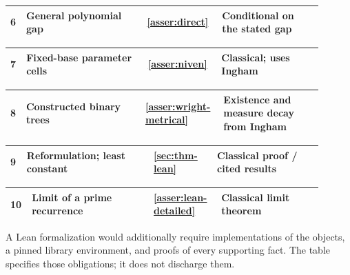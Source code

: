 \documentclass[11pt,reqno]{amsart}
\theoremstyle{blueplain}
\newcounter{asser}
\numberwithin{equation}{section}
\begin{document}
\begin{center}
\begin{tabular}{|@{}p{0.03699\linewidth}|p{0.36986\linewidth}|p{0.18493\linewidth}|p{0.30822\linewidth}|}
\hline
\end{tabular}%
\par\setlength{\parskip}{0pt}\nointerlineskip
\noindent
\begin{tabular}{|@{}p{0.03699\linewidth}|p{0.36986\linewidth}|p{0.18493\linewidth}|p{0.30822\linewidth}|}\hline
{6} & {General polynomial gap} & {\cref{asser:direct}} & {Conditional on the stated gap}\\
\hline
\end{tabular}%
\par\setlength{\parskip}{0pt}\nointerlineskip
\noindent
\begin{tabular}{|@{}p{0.03699\linewidth}|p{0.36986\linewidth}|p{0.18493\linewidth}|p{0.30822\linewidth}|}\hline
{7} & {Fixed-base parameter cells} & {\cref{asser:niven}} & {Classical; uses Ingham}\\
\hline
\end{tabular}%
\par\setlength{\parskip}{0pt}\nointerlineskip
\noindent
\begin{tabular}{|@{}p{0.03699\linewidth}|p{0.36986\linewidth}|p{0.18493\linewidth}|p{0.30822\linewidth}|}\hline
{8} & {Constructed binary trees} & {\cref{asser:wright-metrical}} & {Existence and measure decay from Ingham}\\
\hline
\end{tabular}%
\par\setlength{\parskip}{0pt}\nointerlineskip
\noindent
\begin{tabular}{|@{}p{0.03699\linewidth}|p{0.36986\linewidth}|p{0.18493\linewidth}|p{0.30822\linewidth}|}\hline
{9} & {Reformulation; least constant} & {\cref{sec:thm-lean}} & {Classical proof / cited results}\\
\hline
\end{tabular}%
\par\setlength{\parskip}{0pt}\nointerlineskip
\noindent
\begin{tabular}{|@{}p{0.03699\linewidth}|p{0.36986\linewidth}|p{0.18493\linewidth}|p{0.30822\linewidth}|}\hline
{10} & {Limit of a prime recurrence} & {\cref{asser:lean-detailed}} & {Classical limit theorem}\\
\hline
\end{tabular}\par
\endgroup
\end{center}
A Lean formalization would additionally require implementations of the
objects, a pinned library environment, and proofs of every supporting fact.
The table specifies those obligations; it does not discharge them.
\end{document}
